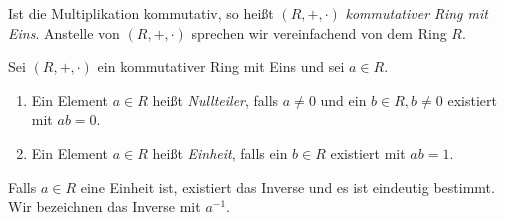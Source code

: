 \begin{bem} %
Ist die Multiplikation kommutativ, so heißt $\left(R, +, \cdot\right)$ \textit{kommutativer Ring mit Eins}. Anstelle von $\left(R, +, \cdot\right)$ sprechen wir vereinfachend von dem Ring $R$.
\end{bem}
%
\begin{defn}
Sei $\left(R, +, \cdot\right)$ ein kommutativer Ring mit Eins und sei $a \in R$.
\begin{enumerate}
\item Ein Element $a \in R$ heißt \textit{Nullteiler}, falls $a \neq 0$ und ein $b \in R, b \neq 0$ existiert mit $ab =0$.
\item Ein Element $a \in R$ heißt \textit{Einheit}, falls ein $b \in R$ existiert mit $ab = 1$. 
\end{enumerate}
\end{defn}
%
%
%
\begin{bem}
Falls $a\in R$ eine Einheit ist, existiert das Inverse und es ist eindeutig bestimmt. Wir bezeichnen das Inverse mit $a^{-1}$.
\end{bem}

